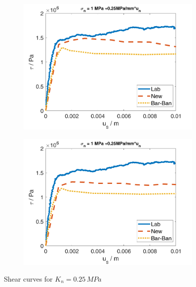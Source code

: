 \begin{figure}
\begin{subfigure}[c]{0.48\textwidth}
\includegraphics[width=0.99\textwidth]{./figures/MEX3-2_025ShearCurveOrig.png}
\end{subfigure}
\begin{subfigure}[c]{0.48\textwidth}
\includegraphics[width=0.99\textwidth]{./figures/MEX3-2_025ShearCurveWithout.png}
\end{subfigure}
\caption{Shear curves for $K_n=0.25\,\unit{MPa}$}
\label{fig:MEX3_2_025ShearCurve}
\end{figure}

